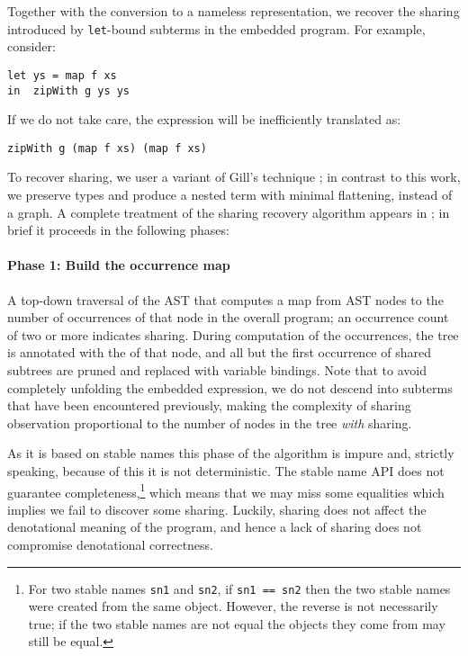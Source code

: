 Together with the conversion to a nameless representation, we recover the
sharing introduced by \texttt{let}-bound subterms in the embedded program. For
example, consider:
%
\begin{lstlisting}[style=Haskell]
let ys = map f xs
in  zipWith g ys ys
\end{lstlisting}
%
If we do not take care, the expression will be inefficiently translated as:
%
\begin{lstlisting}[style=Haskell]
zipWith g (map f xs) (map f xs)
\end{lstlisting}
%
To recover sharing, we user a variant of Gill's technique \cite{Gill:2009}; in
contrast to this work, we preserve types and produce a nested term with minimal
flattening, instead of a graph. A complete treatment of the sharing recovery
algorithm appears in \derp; in brief it proceeds in the following phases:

\paragraph{Phase 1: Build the occurrence map}

A top-down traversal of the AST that computes a map from AST nodes to the number
of occurrences of that node in the overall program; an occurrence count of two
or more indicates sharing. During computation of the occurrences, the tree is
annotated with the  \cite{Jones:2000} of that node, and all
but the first occurrence of shared subtrees are pruned and replaced with
variable bindings. Note that to avoid completely unfolding the embedded
expression, we do not descend into subterms that have been encountered
previously, making the complexity of sharing observation proportional to the
number of nodes in the tree \emph{with} sharing.

As it is based on stable names this phase of the algorithm is impure and,
strictly speaking, because of this it is not deterministic. The stable name API
does not guarantee completeness,\footnote{For two stable names \lstinline{sn1}
and \lstinline{sn2}, if \lstinline{sn1 == sn2} then the two stable names were
created from the same object. However, the reverse is not necessarily true; if
the two stable names are not equal the objects they come from may still be
equal.} which means that we may miss some equalities which implies we fail to
discover some sharing. Luckily, sharing does not affect the denotational meaning
of the program, and hence a lack of sharing does not compromise denotational
correctness.


